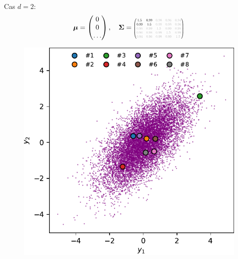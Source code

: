 \documentclass[xcolor=svgnames, t]{beamer}
\newcommand{\vectorx}[1]{\boldsymbol{\MakeLowercase{\mathbf{#1}}}}
\newcommand{\matrixx}[1]{\boldsymbol{\MakeUppercase{#1}}}
\newcommand{\scalemath}[2]{\scalebox{#1}{\mbox{\ensuremath{\displaystyle #2}}}}
\begin{document}
\begin{frame}{\subsecname}
  Cas $d=2$:
  \begin{equation*}
    \vectorx{\mu}
    =
    \begin{pmatrix}
      0 \\
      0 \\
      \dots
    \end{pmatrix},
    \quad
    \matrixx{\Sigma}
    =
    \scalemath{0.5}{
      \begin{pmatrix}
        1.5 & 0.99 & \color{lightgray}0.98 & \color{lightgray}0.96 & \color{lightgray}0.94 \\
        0.99 & 1.5 & \color{lightgray}0.99 & \color{lightgray}0.98 & \color{lightgray}0.96 \\
        \color{lightgray}0.98 & \color{lightgray}0.99 & \color{lightgray}1.5 & \color{lightgray}0.99 & \color{lightgray}0.98 \\
        \color{lightgray}0.96 & \color{lightgray}0.98 & \color{lightgray}0.99 & \color{lightgray}1.5 & \color{lightgray}0.99 \\
        \color{lightgray}0.94 & \color{lightgray}0.96 & \color{lightgray}0.98 & \color{lightgray}0.99 & \color{lightgray}1.5
        \end{pmatrix}
    }
  \end{equation*}
  \begin{figure}[ht]
    \includegraphics[scale=0.4]{gaussian_2d_2outof5.pdf}

\end{figure}
\end{frame}
\end{document}
